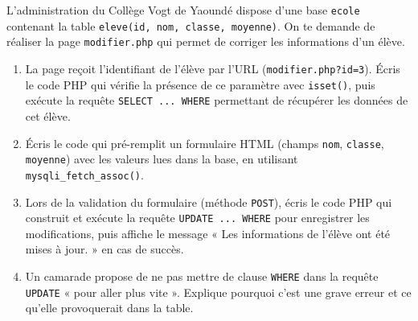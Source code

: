 \documentclass[11pt]{article}
\begin{document}
\begin{exercice}
L'administration du Collège Vogt de Yaoundé dispose d'une base \texttt{ecole} contenant la table \texttt{eleve(id, nom, classe, moyenne)}. On te demande de réaliser la page \texttt{modifier.php} qui permet de corriger les informations d'un élève.
\begin{enumerate}
\item La page reçoit l'identifiant de l'élève par l'URL (\texttt{modifier.php?id=3}). Écris le code PHP qui vérifie la présence de ce paramètre avec \texttt{isset()}, puis exécute la requête \texttt{SELECT ... WHERE} permettant de récupérer les données de cet élève.
\item Écris le code qui pré-remplit un formulaire HTML (champs \texttt{nom}, \texttt{classe}, \texttt{moyenne}) avec les valeurs lues dans la base, en utilisant \texttt{mysqli\_fetch\_assoc()}.
\item Lors de la validation du formulaire (méthode \texttt{POST}), écris le code PHP qui construit et exécute la requête \texttt{UPDATE ... WHERE} pour enregistrer les modifications, puis affiche le message « Les informations de l'élève ont été mises à jour. » en cas de succès.
\item Un camarade propose de ne pas mettre de clause \texttt{WHERE} dans la requête \texttt{UPDATE} « pour aller plus vite ». Explique pourquoi c'est une grave erreur et ce qu'elle provoquerait dans la table.
\end{enumerate}
\end{exercice}
\end{document}
